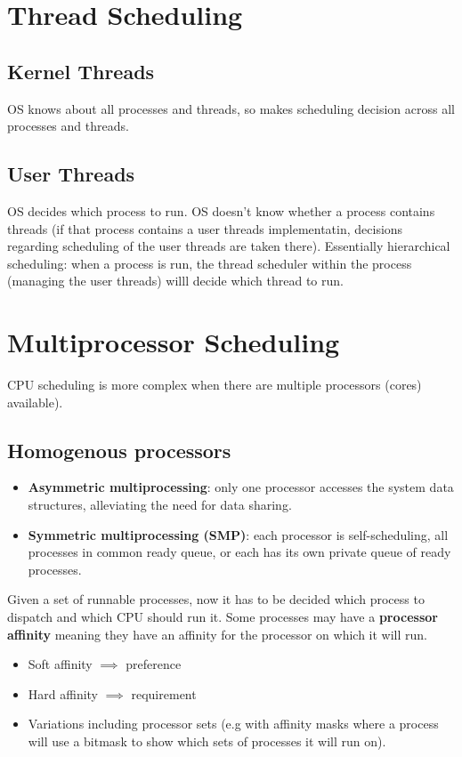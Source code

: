 \documentclass{article}
\begin{document}
\section{Thread Scheduling}
\subsection{Kernel Threads}
OS knows about all processes and threads, so makes scheduling decision across all processes and threads.

\subsection{User Threads}
OS decides which process to run.
OS doesn't know whether a process contains threads (if that process contains a user threads implementatin, decisions regarding scheduling of the user threads are taken there).
Essentially hierarchical scheduling: when a process is run, the thread scheduler within the process (managing the user threads) willl decide which thread to run.

\section{Multiprocessor Scheduling}
CPU scheduling is more complex when there are multiple processors (cores) available).
\subsection{Homogenous processors}
\begin{itemize}
	\item \textbf{Asymmetric multiprocessing}: only one processor accesses the system data structures, alleviating the need for data sharing.
	\item \textbf{Symmetric multiprocessing (SMP)}: each processor is self-scheduling, all processes in common ready queue, or each has its own private queue of ready processes.
\end{itemize}
Given a set of runnable processes, now it has to be decided which process to dispatch and which CPU should run it.
Some processes may have a \textbf{processor affinity} meaning they have an affinity for the processor on which it will run.
\begin{itemize}
	\item Soft affinity $\implies$ preference
	\item Hard affinity $\implies$ requirement
	\item Variations including processor sets (e.g with affinity masks where a process will use a bitmask  to show which sets of processes it will run on).
\end{itemize}
\end{document}
